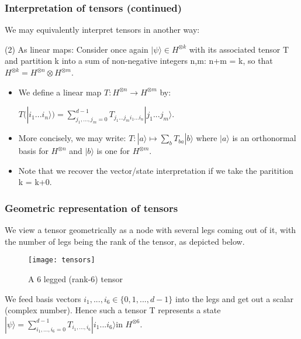 \documentclass[11pt]{beamer}
\newcommand{\vs}{\vskip10pt}
\begin{document}
\begin{frame}
	
	\frametitle{Interpretation of tensors (continued)}
	
	We may equivalently interpret tensors in another way: 
	\vs
	
	(2) As linear maps: Consider once again $ |\psi \rangle \in H^{\otimes k} $ with its associated tensor T and partition k into a sum of non-negative integers n,m: n+m = k, so that $ H^{\otimes k} = H^{\otimes n} \otimes H^{\otimes m} $. 
	
	\begin{itemize}
		
		\item We define a linear map $ T: H^{\otimes n} \rightarrow H^{\otimes m} $ by:
		
		\vs
		$ T(|i_1...i_n \rangle) = \sum_{j_1,...,j_m = 0}^{d-1} T_{j_1...j_mi_1...i_n} |j_1...j_m \rangle $.
		\vs
		\item More concisely, we may write: $T: |a\rangle \mapsto \sum_{b} T_{ba} |b\rangle $ where $ |a \rangle $ is an orthonormal basis for $H^{\otimes n}$ and $ |b \rangle $ is one for $H^{\otimes m}$. 
		\vs
		\item Note that we recover the vector/state interpretation if we take the paritition k = k+0. 
		
	\end{itemize}
	
	
\end{frame}


\begin{frame}
	
	\frametitle{Geometric representation of tensors}

	We view a tensor geometrically as a node with several legs coming out of it, with the number of legs being the rank of the tensor, as depicted below. 
	
	\begin{figure}
		\centering
		\texttt{[image: tensors]}
		\caption{A 6 legged (rank-6) tensor}
		\label{Figure 1: A 6 legged tensor.}
	\end{figure}

	We feed basis vectors $ i_1,...,i_6  \in \{0,1,...,d-1\}$ into the legs and get out a scalar (complex number). Hence such a tensor T represents a state $ |\psi \rangle = \sum_{i_1,...,i_6 = 0}^{d-1} T_{i_1,...,i_6} |i_1...i_6 \rangle $in $ H^{\otimes 6} $.

	
\end{frame}
\end{document}
